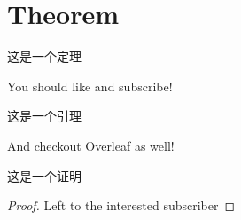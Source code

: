 \section{Theorem}


这是一个定理

\begin{theorem}[YouTube]  %
    You should like and subscribe!
\end{theorem}

这是一个引理

\begin{lemma}
    And checkout Overleaf as well!
\end{lemma}

这是一个证明

\begin{proof}
    Left to the interested subscriber
\end{proof}
